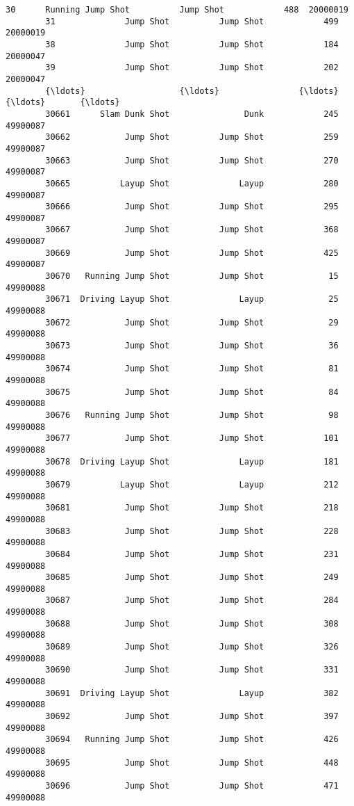 \documentclass[11pt]{article}
\begin{document}
\begin{Verbatim}[commandchars=\\\{\}]
        30      Running Jump Shot          Jump Shot            488  20000019   
        31              Jump Shot          Jump Shot            499  20000019   
        38              Jump Shot          Jump Shot            184  20000047   
        39              Jump Shot          Jump Shot            202  20000047   
        {\ldots}                   {\ldots}                {\ldots}            {\ldots}       {\ldots}   
        30661      Slam Dunk Shot               Dunk            245  49900087   
        30662           Jump Shot          Jump Shot            259  49900087   
        30663           Jump Shot          Jump Shot            270  49900087   
        30665          Layup Shot              Layup            280  49900087   
        30666           Jump Shot          Jump Shot            295  49900087   
        30667           Jump Shot          Jump Shot            368  49900087   
        30669           Jump Shot          Jump Shot            425  49900087   
        30670   Running Jump Shot          Jump Shot             15  49900088   
        30671  Driving Layup Shot              Layup             25  49900088   
        30672           Jump Shot          Jump Shot             29  49900088   
        30673           Jump Shot          Jump Shot             36  49900088   
        30674           Jump Shot          Jump Shot             81  49900088   
        30675           Jump Shot          Jump Shot             84  49900088   
        30676   Running Jump Shot          Jump Shot             98  49900088   
        30677           Jump Shot          Jump Shot            101  49900088   
        30678  Driving Layup Shot              Layup            181  49900088   
        30679          Layup Shot              Layup            212  49900088   
        30681           Jump Shot          Jump Shot            218  49900088   
        30683           Jump Shot          Jump Shot            228  49900088   
        30684           Jump Shot          Jump Shot            231  49900088   
        30685           Jump Shot          Jump Shot            249  49900088   
        30687           Jump Shot          Jump Shot            284  49900088   
        30688           Jump Shot          Jump Shot            308  49900088   
        30689           Jump Shot          Jump Shot            326  49900088   
        30690           Jump Shot          Jump Shot            331  49900088   
        30691  Driving Layup Shot              Layup            382  49900088   
        30692           Jump Shot          Jump Shot            397  49900088   
        30694   Running Jump Shot          Jump Shot            426  49900088   
        30695           Jump Shot          Jump Shot            448  49900088   
        30696           Jump Shot          Jump Shot            471  49900088   
        

\end{Verbatim}
\end{document}
